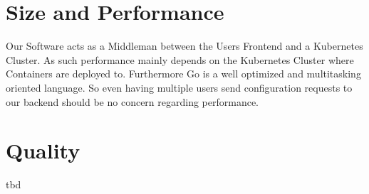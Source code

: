 \documentclass[a4paper,12pt,chapterprefix=false,bibliography=totoc,listof=totoc,]{scrreprt}
\begin{document}


\chapter{Size and Performance}
Our Software acts as a Middleman between the Users Frontend and a Kubernetes Cluster. As such performance mainly depends on the Kubernetes Cluster where Containers are deployed to. Furthermore Go is a well optimized and multitasking oriented language. So even having multiple users send configuration requests to our backend should be no concern regarding performance.

\chapter{Quality}

\gls{tbd}
\end{document}
